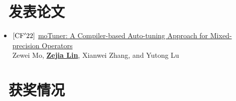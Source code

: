 \documentclass{resume}
\begin{document}
\section{\faBook\ 发表论文}

\begin{itemize}
  \item $[\rm{CF'22}]$ \href{https://dl.acm.org/doi/10.1145/3528416.3530231}{moTuner: A Compiler-based Auto-tuning Approach for Mixed-precision Operators} \\ Zewei Mo, \underline{\textbf{Zejia Lin}}, Xianwei Zhang, and Yutong Lu
\end{itemize}



\section{\faHeartO\ 获奖情况}

\begin{onehalfspacing}
\end{onehalfspacing}


%
%
\end{document}
